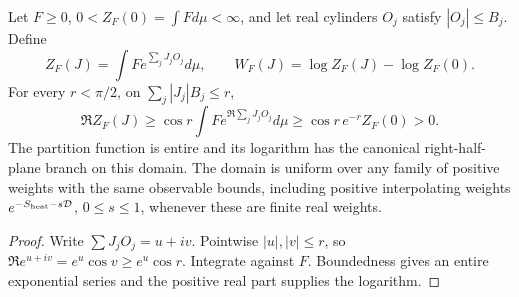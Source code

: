 \documentclass[12pt,a4paper]{article}
\begin{document}
\begin{theorem}
\label{p12:thm:v202-bounded-source-domain}
Let $F\ge0$, $0<Z_F(0)=\int Fd\mu<\infty$, and let real cylinders
$O_j$ satisfy $|O_j|\le B_j$. Define
\[
 Z_F(J)=\int F e^{\sum_jJ_jO_j}d\mu,\qquad
 W_F(J)=\log Z_F(J)-\log Z_F(0).
\]
For every $r<\pi/2$, on $\sum_j|J_j|B_j\le r$,
\begin{equation}
 \Re Z_F(J)\ge\cos r\int F e^{\Re\sum_jJ_jO_j}d\mu
 \ge\cos r\,e^{-r}Z_F(0)>0.
 \label{p12:eq:v202-source-half-plane}
\end{equation}
The partition function is entire and its logarithm has the canonical
right-half-plane branch on this domain. The domain is uniform over any
family of positive weights with the same observable bounds, including
positive interpolating weights $e^{-S_{\rm heat}-s\mathcal D}$,
$0\le s\le1$, whenever these are finite real weights.
\end{theorem}
\begin{proof}
Write $\sum J_jO_j=u+iv$. Pointwise $|u|,|v|\le r$, so
$\Re e^{u+iv}=e^u\cos v\ge e^u\cos r$. Integrate against $F$.
Boundedness gives an entire exponential series and the positive real
part supplies the logarithm.
\end{proof}
\end{document}
